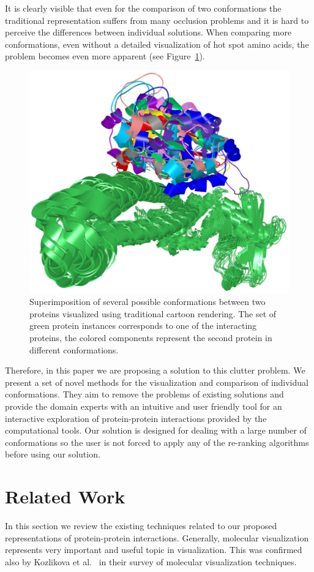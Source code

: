 \documentclass[journal]{vgtc}                %
\begin{document}
It is clearly visible that even for the comparison of two conformations the traditional representation suffers from many occlusion problems and it is hard to perceive the differences between individual solutions.
When comparing more conformations, even without a detailed visualization of hot spot amino acids, the problem becomes even more apparent (see Figure~\ref{fig:problem}).

\begin{figure}[tb]
  \centering
  \includegraphics[width=0.7\columnwidth]{problem.png}
  \caption{Superimposition of several possible conformations between two proteins visualized using traditional cartoon rendering. The set of green protein instances corresponds to one of
the interacting proteins, the colored components represent the second protein in different conformations.}
  \label{fig:problem}
\end{figure}

Therefore, in this paper we are proposing a solution to this clutter problem.
We present a set of novel methods for the visualization and comparison of individual conformations.
They aim to remove the problems of existing solutions and provide the domain experts with an intuitive and user friendly tool for an interactive exploration of protein-protein interactions provided by the computational tools.
Our solution is designed for dealing with a large number of conformations so the user is not forced to apply any of the re-ranking algorithms before using our solution. 


\section{Related Work}
In this section we review the existing techniques related to our proposed representations of protein-protein interactions.
Generally, molecular visualization represents very important and useful topic in visualization.
This was confirmed also by Kozlikova et al.~\cite{Kozlikova2015} in their survey of molecular visualization techniques.
\end{document}
